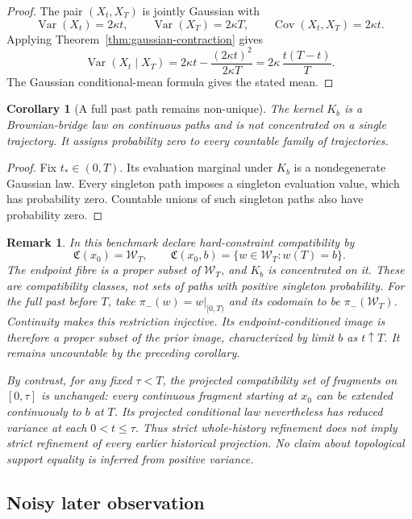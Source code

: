 \documentclass[11pt]{article}
\newtheorem{corollary}[definition]{Corollary}
\newtheorem{remark}[definition]{Remark}
\newcommand{\Wcal}{\mathcal W}
\newcommand{\Ccal}{\mathfrak C}
\begin{document}
\begin{proof}
The pair \((X_t,X_T)\) is jointly Gaussian with
\[
\operatorname{Var}(X_t)=2\kappa t,
\qquad
\operatorname{Var}(X_T)=2\kappa T,
\qquad
\operatorname{Cov}(X_t,X_T)=2\kappa t.
\]
Applying Theorem~\ref{thm:gaussian-contraction} gives
\[
\operatorname{Var}(X_t\mid X_T)
=
2\kappa t-\frac{(2\kappa t)^2}{2\kappa T}
=
2\kappa\,\frac{t(T-t)}{T}.
\]
The Gaussian conditional-mean formula gives the stated mean.
\end{proof}

\begin{corollary}[A full past path remains non-unique]
\label{cor:path-nonuniqueness}
The kernel $K_b$ is a Brownian-bridge law on continuous paths
and is not concentrated on a single trajectory. It assigns probability
zero to every countable family of trajectories.
\end{corollary}
\begin{proof}
Fix $t_*\in(0,T)$. Its evaluation marginal under $K_b$ is a
nondegenerate Gaussian law. Every singleton path imposes a singleton
evaluation value, which has probability zero. Countable unions of such
singleton paths also have probability zero.
\end{proof}

\begin{remark}
In this benchmark declare hard-constraint compatibility by
\[
\Ccal(x_0)=\Wcal_T,\qquad
\Ccal(x_0,b)=\{w\in\Wcal_T:w(T)=b\}.
\]
The endpoint fibre is a proper subset of $\Wcal_T$, and $K_b$ is
concentrated on it. These are compatibility classes, not sets of paths
with positive singleton probability.
For the full past before $T$, take $\pi_-(w)=w|_{[0,T)}$ and its
codomain to be $\pi_-(\Wcal_T)$. Continuity makes this restriction
injective. Its endpoint-conditioned image is therefore a proper
subset of the prior image, characterized by limit $b$ as $t\uparrow T$.
It remains uncountable by the preceding corollary.

By contrast, for any fixed $\tau<T$, the projected compatibility set
of fragments on $[0,\tau]$ is unchanged: every continuous fragment
starting at $x_0$ can be extended continuously to $b$ at $T$.
Its projected conditional law nevertheless has reduced variance at
each $0<t\le\tau$. Thus strict whole-history refinement does not imply
strict refinement of every earlier historical projection. No claim
about topological support equality is inferred from positive variance.
\end{remark}

\subsection{Noisy later observation}
\end{document}

